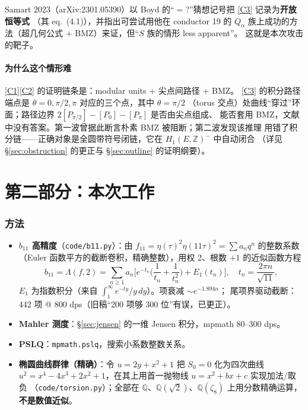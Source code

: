 \documentclass[11pt,a4paper]{ctexart}
\theoremstyle{remark}
\newcommand{\QQ}{\mathbb{Q}}
\newcommand{\ZZ}{\mathbb{Z}}
\newcommand{\bN}{b_{11}}
\newcommand{\dd}{\,d}
\begin{document}
Samart 2023（arXiv:2301.05390）以 Boyd 的``$=$?''猜想记号把 \eqref{C3} 记录为\textbf{开放恒等式}
（其 eq.~(4.1)），并指出可尝试用他在
conductor 19 的 $Q_\alpha$ 族上成功的方法（超几何公式 + BMZ）来证，但“$S$ 族的情形 less apparent”。
这就是本次攻击的靶子。

\subsection{为什么这个情形难}\label{sec:whyhard}

\eqref{C1}\eqref{C2} 的证明链条是：modular units + 尖点间路径 + BMZ。
\eqref{C3} 的积分路径端点是 $\theta=0,\pi/2,\pi$ 对应的三个点，其中 $\theta=\pi/2$
（torus 交点）处曲线“穿过”环面；路径边界 $2[P_{\pi/2}]-[P_0]-[P_\pi]$ 是否由尖点组成、
能否套用 BMZ，文献中没有答案。第一波曾据此断言朴素 BMZ 被阻断；第二波发现该推理
用错了积分链——正确对象是全圆带符号闭链，它在 $H_1(E,\ZZ)^-$ 中自动闭合
（详见 \S\ref{sec:obstruction} 的更正与 \S\ref{sec:outline} 的证明纲要）。

\part*{第二部分：本次工作}

\section{方法}

\begin{itemize}
\item \textbf{$\bN$ 高精度}（\texttt{code/b11.py}）：由
$f_{11}=\eta(\tau)^2\eta(11\tau)^2=\sum a_nq^n$ 的整数系数
（Euler 函数平方的截断卷积，精确整数），用权 2、根数 $+1$ 的近似函数方程
\[
\bN=\Lambda(f,2)=\sum_{n\ge1}a_n\Big[e^{-t_n}\Big(\frac1{t_n}+\frac1{t_n^2}\Big)+E_1(t_n)\Big],
\quad t_n=\frac{2\pi n}{\sqrt{11}},
\]
$E_1$ 为指数积分（来自 $\int_1^\infty e^{-ty}/y\dd y$）。项衰减 $\sim e^{-1.894n}$；
尾项界驱动截断：442 项 @ 800 dps（旧稿``200 项够 300 位''有误，已更正）。
\item \textbf{Mahler 测度}：\S\ref{sec:jensen} 的一维 Jensen 积分，mpmath 80--300 dps。
\item \textbf{PSLQ}：\texttt{mpmath.pslq}，搜索小系数整数关系。
\item \textbf{椭圆曲线群律（精确）}：令 $u=2y+x^2+1$ 把 $S_0=0$ 化为四次曲线
$u^2=x^4-4x^3+2x^2+1$，在其上用首一抛物线 $u=x^2+bx+c$ 实现加法/取负
（\texttt{code/torsion.py}）；全部在 $\QQ$、$\QQ(\sqrt2)$、$\QQ(\zeta_8)$ 上用分数精确运算，
\textbf{不是数值近似}。
\end{itemize}
\end{document}
